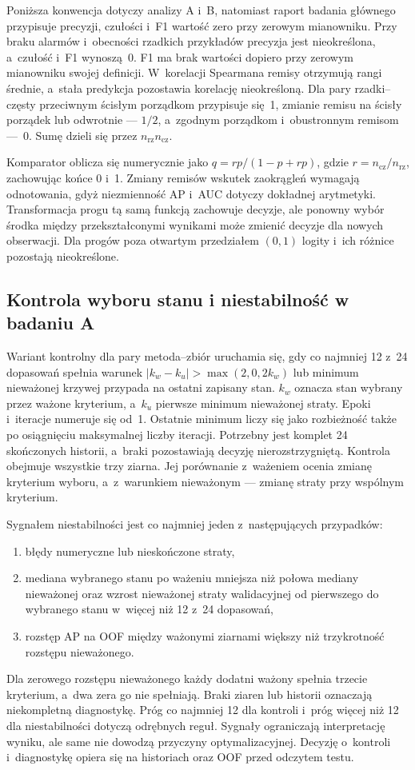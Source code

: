 Poniższa konwencja dotyczy analizy A i~B, natomiast raport badania głównego przypisuje precyzji, czułości i~F1 wartość zero przy zerowym mianowniku. Przy braku alarmów i~obecności rzadkich przykładów precyzja jest nieokreślona, a~czułość i~F1 wynoszą~0. F1 ma brak wartości dopiero przy zerowym mianowniku swojej definicji. W~korelacji Spearmana remisy otrzymują rangi średnie, a~stała predykcja pozostawia korelację nieokreśloną. Dla pary rzadki--częsty przeciwnym ścisłym porządkom przypisuje się~1, zmianie remisu na ścisły porządek lub odwrotnie --- $1/2$, a~zgodnym porządkom i~obustronnym remisom ---~0. Sumę dzieli się przez $n_{\mathrm{rz}}n_{\mathrm{cz}}$.

Komparator oblicza się numerycznie jako $q=rp/(1-p+rp)$, gdzie $r=n_{\mathrm{cz}}/n_{\mathrm{rz}}$, zachowując końce 0 i~1. Zmiany remisów wskutek zaokrągleń wymagają odnotowania, gdyż niezmienność AP i~AUC dotyczy dokładnej arytmetyki. Transformacja progu tą samą funkcją zachowuje decyzje, ale ponowny wybór środka między przekształconymi wynikami może zmienić decyzje dla nowych obserwacji. Dla progów poza otwartym przedziałem $(0,1)$ logity i~ich różnice pozostają nieokreślone.

\subsection*{Kontrola wyboru stanu i niestabilność w badaniu A}
\label{app:kontrola-a}

Wariant kontrolny dla pary metoda--zbiór uruchamia się, gdy co najmniej 12 z~24 dopasowań spełnia warunek $|k_w-k_u|>\max(2,0{,}2k_w)$ lub minimum nieważonej krzywej przypada na ostatni zapisany stan. $k_w$ oznacza stan wybrany przez ważone kryterium, a~$k_u$ pierwsze minimum nieważonej straty. Epoki i~iteracje numeruje się od~1. Ostatnie minimum liczy się jako rozbieżność także po osiągnięciu maksymalnej liczby iteracji. Potrzebny jest komplet 24 skończonych historii, a~braki pozostawiają decyzję nierozstrzygniętą. Kontrola obejmuje wszystkie trzy ziarna. Jej porównanie z~ważeniem ocenia zmianę kryterium wyboru, a~z~warunkiem nieważonym --- zmianę straty przy wspólnym kryterium.

Sygnałem niestabilności jest co najmniej jeden z~następujących przypadków:
\begin{enumerate}
\item błędy numeryczne lub nieskończone straty,
\item mediana wybranego stanu po ważeniu mniejsza niż połowa mediany nieważonej oraz wzrost nieważonej straty walidacyjnej od pierwszego do wybranego stanu w~więcej niż 12 z~24 dopasowań,
\item rozstęp AP na OOF między ważonymi ziarnami większy niż trzykrotność rozstępu nieważonego.
\end{enumerate}
Dla zerowego rozstępu nieważonego każdy dodatni ważony spełnia trzecie kryterium, a~dwa zera go nie spełniają. Braki ziaren lub historii oznaczają niekompletną diagnostykę. Próg co najmniej 12 dla kontroli i~próg więcej niż 12 dla niestabilności dotyczą odrębnych reguł. Sygnały ograniczają interpretację wyniku, ale same nie dowodzą przyczyny optymalizacyjnej. Decyzję o~kontroli i~diagnostykę opiera się na historiach oraz OOF przed odczytem testu.

